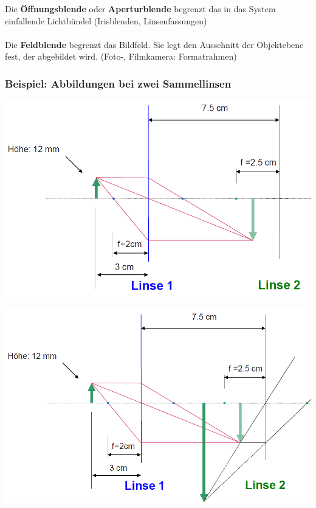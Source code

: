 Die \textbf{Öffnungsblende} oder \textbf{Aperturblende} begrenzt das in das System einfallende Lichtbündel \small (Irisblenden, Linsenfassungen)\normalsize \\
\\
Die \textbf{Feldblende} begrenzt das Bildfeld. Sie legt den Ausschnitt der Objektebene fest, der abgebildet wird. \small (Foto-, Filmkamera: Formatrahmen) \normalsize


\subsubsection{Beispiel: Abbildungen bei zwei Sammellinsen}

\begin{minipage}{0.48\linewidth}
\includegraphics[width=0.98\linewidth]{Bilder/Wellen-Optik/zwei_sammellinsen_1} 
\end{minipage}
\hfill
\begin{minipage}{0.48\linewidth}
\includegraphics[width=0.98\linewidth]{Bilder/Wellen-Optik/zwei_sammellinsen_2} 
\end{minipage}



